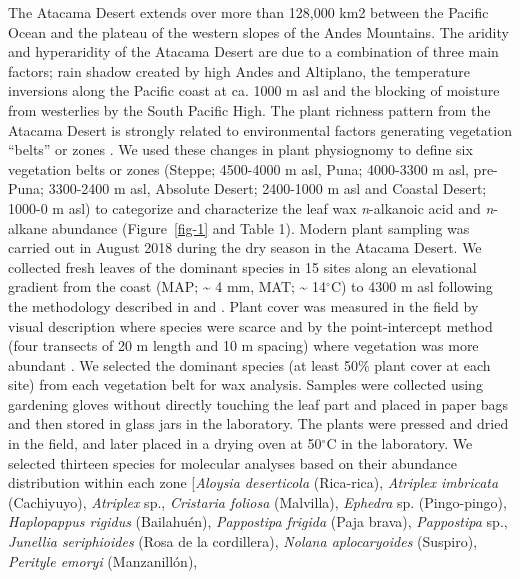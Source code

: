 \documentclass[
  authoryear,
  preprint,
  3p]{elsarticle}
\begin{document}
The Atacama Desert extends over more than 128,000 km2 between the
Pacific Ocean and the plateau of the western slopes of the Andes
Mountains. The aridity and hyperaridity of the Atacama Desert are due to
a combination of three main factors; rain shadow created by high Andes
and Altiplano, the temperature inversions along the Pacific coast at ca.
1000 m asl and the blocking of moisture from westerlies by the South
Pacific High. The plant richness pattern from the Atacama Desert is
strongly related to environmental factors generating vegetation
``belts'' or zones
\citep[Figure~\ref{fig-1}]{villagranVegetationHighAndean1981, diazNitrogenCyclingExtreme2016, diazMultiscaleClimateChange2019}.
We used these changes in plant physiognomy
\citep{arroyoPlantPhenologicalPatterns1981} to define six vegetation
belts or zones (Steppe; 4500-4000 m asl, Puna; 4000-3300 m asl,
pre-Puna; 3300-2400 m asl, Absolute Desert; 2400-1000 m asl and Coastal
Desert; 1000-0 m asl) to categorize and characterize the leaf wax
\emph{n}-alkanoic acid and \emph{n}-alkane abundance (Figure~\ref{fig-1}
and Table 1). Modern plant sampling was carried out in August 2018
during the dry season in the Atacama Desert. We collected fresh leaves
of the dominant species in 15 sites along an elevational gradient from
the coast (MAP; \textasciitilde{} 4 mm, MAT; \textasciitilde{}
14\(^\circ\)C) to 4300 m asl following the methodology described in
\citet{diazNitrogenCyclingExtreme2016} and
\citet{diazMultiscaleClimateChange2019}. Plant cover was measured in the
field by visual description where species were scarce and by the
point-intercept method (four transects of 20 m length and 10 m spacing)
where vegetation was more abundant \citep{braun1932plant}. We selected
the dominant species (at least 50\(\%\) plant cover at each site) from
each vegetation belt for wax analysis. Samples were collected using
gardening gloves without directly touching the leaf part and placed in
paper bags and then stored in glass jars in the laboratory. The plants
were pressed and dried in the field, and later placed in a drying oven
at 50\(^\circ\)C in the laboratory. We selected thirteen species for
molecular analyses based on their abundance distribution within each
zone {[}\emph{Aloysia deserticola} (Rica-rica), \emph{Atriplex
imbricata} (Cachiyuyo), \emph{Atriplex} sp., \emph{Cristaria foliosa}
(Malvilla), \emph{Ephedra} sp. (Pingo-pingo), \emph{Haplopappus rigidus}
(Bailahuén), \emph{Pappostipa frigida} (Paja brava), \emph{Pappostipa}
sp., \emph{Junellia seriphioides} (Rosa de la cordillera), \emph{Nolana
aplocaryoides} (Suspiro), \emph{Perityle emoryi} (Manzanillón),
\end{document}
